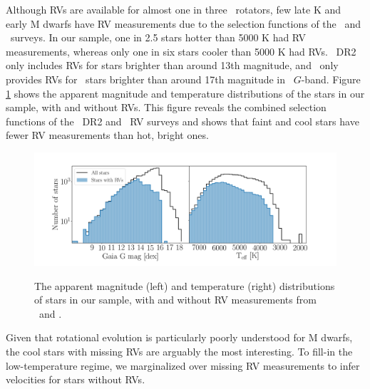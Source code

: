 Although RVs are available for almost one in three \kepler\ rotators, few late
K and early M dwarfs have RV measurements due to the selection functions of
the \gaia\ and \lamost\ surveys.
In our sample, one in 2.5 stars hotter than 5000 K had RV measurements,
whereas only one in six stars cooler than 5000 K had RVs.
\gaia\ DR2 only includes RVs for stars brighter than around 13th magnitude,
and \lamost\ only provides RVs for \kepler\ stars brighter than around 17th
magnitude in \gaia\ $G$-band.
Figure \ref{fig:rv_histogram} shows the apparent magnitude and temperature
distributions of the stars in our sample, with and without RVs.
This figure reveals the combined selection functions of the \gaia\ DR2 and
\lamost\ RV surveys and shows that faint and cool stars have fewer RV
measurements than hot, bright ones.
\begin{figure}[ht!]
\caption{
    The apparent magnitude (left) and temperature (right) distributions of
    stars in our sample, with and without RV measurements from \gaia\ and
    \lamost.
}
  \centering \includegraphics[width=1\textwidth]{rv_histogram}
\label{fig:rv_histogram}
\end{figure}
Given that rotational evolution is particularly poorly understood for M
dwarfs, the cool stars with missing RVs are arguably the most interesting.
To fill-in the low-temperature regime, we marginalized over missing RV
measurements to infer velocities for stars without RVs.

